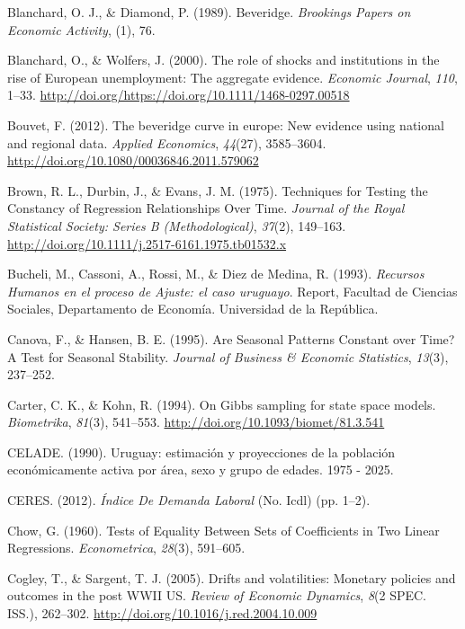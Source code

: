\documentclass[12pt,oneside]{reedthesis}
\begin{document}
\leavevmode\hypertarget{ref-Blanchard1989}{}%
Blanchard, O. J., \& Diamond, P. (1989). Beveridge. \emph{Brookings Papers on Economic Activity}, (1), 76.

\leavevmode\hypertarget{ref-Blanchard2000}{}%
Blanchard, O., \& Wolfers, J. (2000). The role of shocks and institutions in the rise of European unemployment: The aggregate evidence. \emph{Economic Journal}, \emph{110}, 1--33. \url{http://doi.org/https://doi.org/10.1111/1468-0297.00518}

\leavevmode\hypertarget{ref-Bouvet2012}{}%
Bouvet, F. (2012). The beveridge curve in europe: New evidence using national and regional data. \emph{Applied Economics}, \emph{44}(27), 3585--3604. \url{http://doi.org/10.1080/00036846.2011.579062}

\leavevmode\hypertarget{ref-Brown1975}{}%
Brown, R. L., Durbin, J., \& Evans, J. M. (1975). Techniques for Testing the Constancy of Regression Relationships Over Time. \emph{Journal of the Royal Statistical Society: Series B (Methodological)}, \emph{37}(2), 149--163. \url{http://doi.org/10.1111/j.2517-6161.1975.tb01532.x}

\leavevmode\hypertarget{ref-DECON1993}{}%
Bucheli, M., Cassoni, A., Rossi, M., \& Diez de Medina, R. (1993). \emph{Recursos Humanos en el proceso de Ajuste: el caso uruguayo}. Report, Facultad de Ciencias Sociales, Departamento de Economía. Universidad de la República.

\leavevmode\hypertarget{ref-Canova1995}{}%
Canova, F., \& Hansen, B. E. (1995). Are Seasonal Patterns Constant over Time? A Test for Seasonal Stability. \emph{Journal of Business \& Economic Statistics}, \emph{13}(3), 237--252.

\leavevmode\hypertarget{ref-KarterKohn1994}{}%
Carter, C. K., \& Kohn, R. (1994). On Gibbs sampling for state space models. \emph{Biometrika}, \emph{81}(3), 541--553. \url{http://doi.org/10.1093/biomet/81.3.541}

\leavevmode\hypertarget{ref-Celade1990}{}%
CELADE. (1990). Uruguay: estimación y proyecciones de la población económicamente activa por área, sexo y grupo de edades. 1975 - 2025.

\leavevmode\hypertarget{ref-Ceres2012}{}%
CERES. (2012). \emph{Índice De Demanda Laboral} (No. Icdl) (pp. 1--2).

\leavevmode\hypertarget{ref-Chow1960}{}%
Chow, G. (1960). Tests of Equality Between Sets of Coefficients in Two Linear Regressions. \emph{Econometrica}, \emph{28}(3), 591--605.

\leavevmode\hypertarget{ref-Cogley2005}{}%
Cogley, T., \& Sargent, T. J. (2005). Drifts and volatilities: Monetary policies and outcomes in the post WWII US. \emph{Review of Economic Dynamics}, \emph{8}(2 SPEC. ISS.), 262--302. \url{http://doi.org/10.1016/j.red.2004.10.009}
\end{document}
